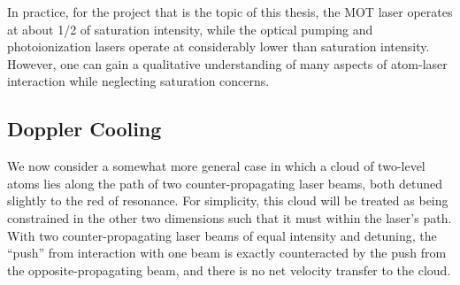In practice, for the project that is the topic of this thesis, the MOT laser operates at about 1/2 of saturation intensity, while the optical pumping
and photoionization lasers operate at considerably lower than saturation
intensity. However, one can gain
a qualitative understanding of many aspects of atom-laser interaction while neglecting saturation concerns.  

%

\subsection{Doppler Cooling}
We now consider a somewhat more general case in which a cloud of two-level atoms lies along the path of two counter-propagating laser beams, both detuned slightly to the red of resonance.  For simplicity, this cloud will be treated as being constrained in the other two dimensions such that it must within the laser's path.  With two counter-propagating laser beams of equal intensity and detuning, the ``push'' from interaction with one beam is exactly counteracted by the push from the opposite-propagating beam, and there is no net velocity transfer to the cloud.  

